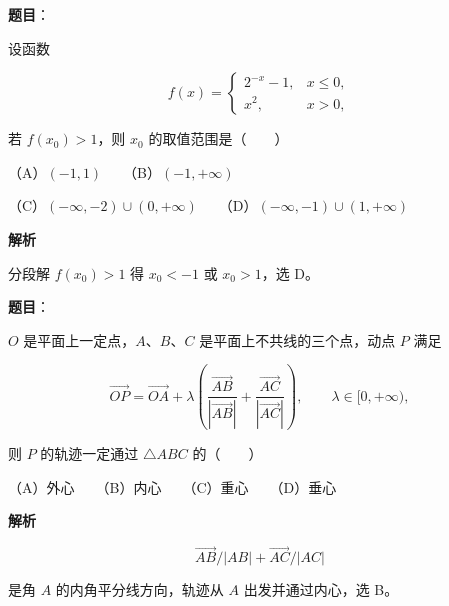 \begin{answer}

\textbf{题目}：

设函数

\nopagebreak[4]
\[
f(x)=
\begin{cases}
2^{-x}-1,&x\leqslant0,\\
x^2,&x>0,
\end{cases}
\]

若 $f(x_0)>1$，则 $x_0$ 的取值范围是\mbox{（　　）}

（A）$(-1,1)$　　（B）$(-1,+\infty)$

（C）$(-\infty,-2)\cup(0,+\infty)$　　（D）$(-\infty,-1)\cup(1,+\infty)$

\textbf{解析}

分段解 $f(x_0)>1$ 得 $x_0<-1$ 或 $x_0>1$，选 D。


\end{answer}
\begin{answer}

\textbf{题目}：

$O$ 是平面上一定点，$A\text{、}B\text{、}C$ 是平面上不共线的三个点，动点 $P$ 满足

\nopagebreak[4]
\[
\overrightarrow{OP}
=\overrightarrow{OA}
+\lambda\left(
\frac{\overrightarrow{AB}}{|\overrightarrow{AB}|}
+\frac{\overrightarrow{AC}}{|\overrightarrow{AC}|}
\right),\qquad \lambda\in[0,+\infty),
\]

则 $P$ 的轨迹一定通过 $\triangle ABC$ 的\mbox{（　　）}

（A）外心　　（B）内心　　（C）重心　　（D）垂心

\textbf{解析}

\nopagebreak[4]
\[
\overrightarrow{AB}/|AB|+\overrightarrow{AC}/|AC|
\]

是角 $A$ 的内角平分线方向，轨迹从 $A$ 出发并通过内心，选 B。


\end{answer}
